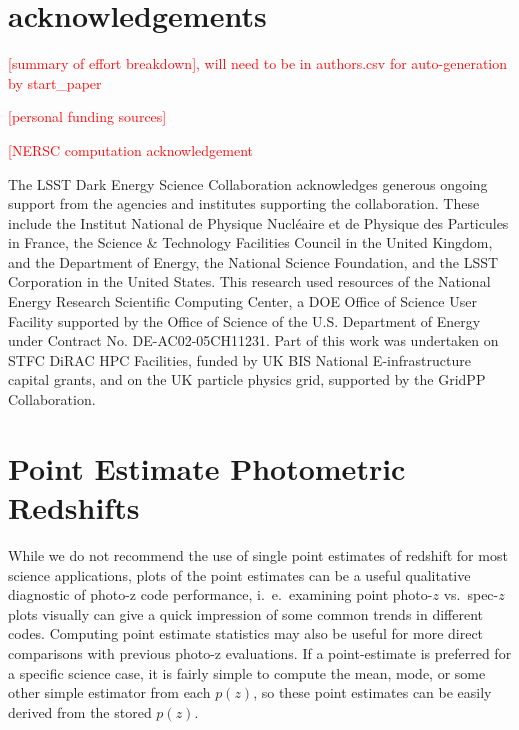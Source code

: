 \documentclass[usenatbib]{mn2e}
\newcommand{\red}[1]{\textcolor{red}{#1}}
\begin{document}
\section*{acknowledgements}
\red{[summary of effort breakdown], will need to be in authors.csv for auto-generation by start\_paper}

\red{[personal funding sources]}

\red{[NERSC computation acknowledgement}

The LSST Dark Energy Science Collaboration acknowledges generous ongoing support from the agencies and institutes supporting the collaboration. These include the Institut National de Physique Nucl\'eaire et de Physique des Particules in France, the Science \& Technology Facilities Council in the United Kingdom, and the Department of Energy, the National Science Foundation, and the LSST Corporation in the United States. This research used resources of the National Energy Research Scientific Computing Center, a DOE Office of Science User Facility supported by the Office of Science of the U.S. Department of Energy under Contract No. DE-AC02-05CH11231. Part of this work was undertaken on STFC DiRAC HPC Facilities, funded by UK BIS National E-infrastructure capital grants, and on the UK particle physics grid, supported by the GridPP Collaboration.

\appendix

 \section{Point Estimate Photometric Redshifts}
 \label{sec:pointmetrics}
 While we do not recommend the use of single point estimates of redshift for most science applications, plots of the point estimates can be a useful qualitative diagnostic of photo-z code performance, i.~e.~examining point photo-$z$ vs.~spec-$z$ plots visually can give a quick impression of some common trends in different codes.  Computing point estimate statistics may also be useful for more direct comparisons with previous photo-z evaluations.  If a point-estimate is preferred for a specific science case, it is fairly simple to compute the mean, mode, or some other simple estimator from each $p(z)$, so these point estimates can be easily derived from the stored $p(z)$.
\end{document}

